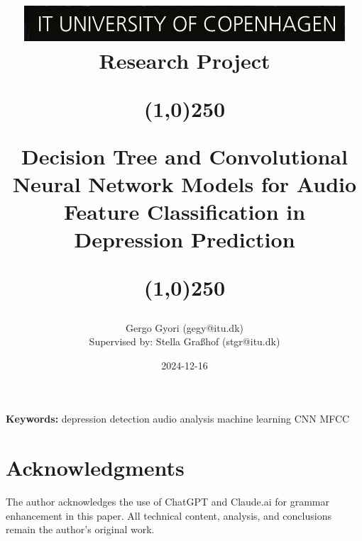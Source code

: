 \documentclass{article}
\title{\includegraphics{images/0.ITU-logo.png}\\[1cm] \huge{Research Project}\\
    \begin{center}
    \line(1,0){250}
    \end{center}
    \huge{Decision Tree and Convolutional Neural Network Models for Audio Feature Classification in Depression Prediction}
    \begin{center}
    \line(1,0){250}
    \end{center}
    }
\author{
  Gergo Gyori  (gegy@itu.dk) \\
  Supervised by: Stella Graßhof (stgr@itu.dk) 
}
\date{2024-12-16}
\begin{document}
\maketitle


\begin{multicols}{2}

\bigskip %
\noindent\textbf{Keywords:} depression detection \textbullet{} audio analysis \textbullet{} machine learning \textbullet{} CNN \textbullet{} MFCC




%





%


\section*{Acknowledgments}  %
The author acknowledges the use of ChatGPT and Claude.ai for grammar enhancement in this paper. All technical content, analysis, and conclusions remain the author's original work.

\appendix



\clearpage
\printbibliography

\end{multicols}
\end{document}

